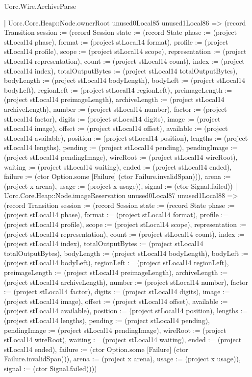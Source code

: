 \begin{lexlean}{Uorc.Wire.ArchiveParse}
\begin{semanticmodule}
{            | Uorc.Core.Heap::Node.ownerRoot unused0Local85 unused1Local86 => (record Transition {session := (record Session {state := (record State {phase := (project stLocal14 phase), format := (project stLocal14 format), profile := (project stLocal14 profile), scope := (project stLocal14 scope), representation := (project stLocal14 representation), count := (project stLocal14 count), index := (project stLocal14 index), totalOutputBytes := (project stLocal14 totalOutputBytes), bodyLength := (project stLocal14 bodyLength), bodyLeft := (project stLocal14 bodyLeft), regionLeft := (project stLocal14 regionLeft), preimageLength := (project stLocal14 preimageLength), archiveLength := (project stLocal14 archiveLength), number := (project stLocal14 number), factor := (project stLocal14 factor), digits := (project stLocal14 digits), image := (project stLocal14 image), offset := (project stLocal14 offset), available := (project stLocal14 available), position := (project stLocal14 position), lengths := (project stLocal14 lengths), pending := (project stLocal14 pending), pendingImage := (project stLocal14 pendingImage), wireRoot := (project stLocal14 wireRoot), waiting := (project stLocal14 waiting), ended := (project stLocal14 ended), failure := (ctor Option.some [Failure] (ctor Failure.invalidSpan))}), arena := (project x arena), usage := (project x usage)}), signal := (ctor Signal.failed)})
            | Uorc.Core.Heap::Node.imageReservation unused0Local87 unused1Local88 => (record Transition {session := (record Session {state := (record State {phase := (project stLocal14 phase), format := (project stLocal14 format), profile := (project stLocal14 profile), scope := (project stLocal14 scope), representation := (project stLocal14 representation), count := (project stLocal14 count), index := (project stLocal14 index), totalOutputBytes := (project stLocal14 totalOutputBytes), bodyLength := (project stLocal14 bodyLength), bodyLeft := (project stLocal14 bodyLeft), regionLeft := (project stLocal14 regionLeft), preimageLength := (project stLocal14 preimageLength), archiveLength := (project stLocal14 archiveLength), number := (project stLocal14 number), factor := (project stLocal14 factor), digits := (project stLocal14 digits), image := (project stLocal14 image), offset := (project stLocal14 offset), available := (project stLocal14 available), position := (project stLocal14 position), lengths := (project stLocal14 lengths), pending := (project stLocal14 pending), pendingImage := (project stLocal14 pendingImage), wireRoot := (project stLocal14 wireRoot), waiting := (project stLocal14 waiting), ended := (project stLocal14 ended), failure := (ctor Option.some [Failure] (ctor Failure.invalidSpan))}), arena := (project x arena), usage := (project x usage)}), signal := (ctor Signal.failed)})))
}
\end{semanticmodule}
\end{lexlean}

